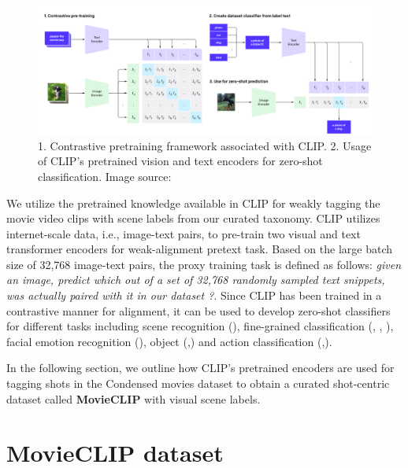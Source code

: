 \begin{figure}[h!]
\centering
  \includegraphics[width=\linewidth]{figures/CLIP_outline_diagram.png}
  \caption{1. Contrastive pretraining framework associated with CLIP. 2. Usage of CLIP's pretrained vision and text encoders for zero-shot classification. Image source: \cite{CLIP}}
  \label{CLIP outline}
\end{figure}
We utilize the pretrained knowledge available in CLIP for weakly tagging the movie video clips with scene labels from our curated taxonomy. 
CLIP utilizes internet-scale data, i.e., image-text pairs, to pre-train two visual and text transformer \cite{transformers} encoders for weak-alignment pretext task. Based on the large batch size of 32,768 image-text pairs, the proxy training task is defined as follows: \textit{given an image, predict which out of a set of 32,768 randomly sampled text snippets, was actually paired with it in our dataset ?}.  Since CLIP has been trained in a contrastive manner for alignment, it can be used to develop zero-shot classifiers for different tasks including scene recognition (\cite{xiao_sun_2016}), fine-grained classification (\cite{parkhi12a}, \cite{bossard14}, \cite{KrauseStarkDengFei-Fei_3DRR2013}), facial emotion recognition (\cite{BarsoumICMI2016}), object (\cite{Deng2009ImageNetAL},\cite{FeiFei2004LearningGV}) and action classification (\cite{Kinetics700},\cite{ucf101}).

In the following section, we outline how CLIP's pretrained encoders are used for tagging shots in the Condensed movies dataset \cite{bain2020condensed} to obtain a curated shot-centric dataset called \textbf{MovieCLIP} with visual scene labels.

\section{MovieCLIP dataset}


